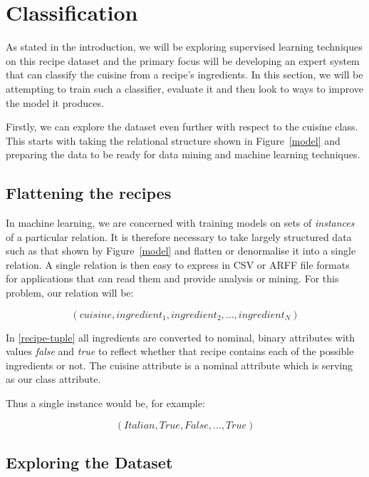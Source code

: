\documentclass[11pt,a4paper]{article}
\begin{document}
\section{Classification}

As stated in the introduction, we will be exploring supervised learning techniques
on this recipe dataset and the primary focus will be developing an expert system
that can classify the cuisine from a recipe's ingredients. In this section,
we will be attempting to train such a classifier, evaluate it and then
look to ways to improve the model it produces.

Firstly, we can explore the dataset even further with respect to the cuisine class.
This starts with taking the relational structure shown in Figure~\ref{model} and
preparing the data to be ready for data mining and machine learning techniques.

\subsection{Flattening the recipes}

In machine learning, we are concerned with training models on sets of \emph{instances}
of a particular relation. It is therefore necessary to take largely structured
data such as that shown by Figure~\ref{model} and flatten or denormalise it into
a single relation. A single relation is then easy to express in CSV or ARFF file
formats for applications that can read them and provide analysis or mining. For this
problem, our relation will be:

\begin{equation} \label{recipe-tuple}
(cuisine, ingredient_1, ingredient_2, ... ,ingredient_N)
\end{equation}

In \eqref{recipe-tuple} all ingredients are converted to nominal, binary attributes
with values \emph{false} and \emph{true} to reflect whether that recipe contains
each of the possible ingredients or not. The cuisine attribute is a nominal
attribute which is serving as our class attribute.

Thus a single instance would be, for example:

\begin{equation} \label{recipe-example}
(Italian, True, False, ... ,True)
\end{equation}


\subsection{Exploring the Dataset}
\end{document}
